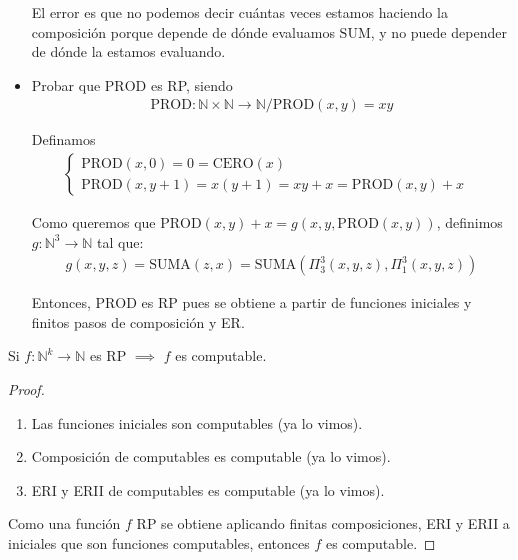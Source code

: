 \begin{itemize}
    El error es que no podemos decir cuántas veces estamos haciendo la 
    composición porque depende de dónde evaluamos $\mathrm{SUM}$, y no puede 
    depender de dónde la estamos evaluando.

    \item Probar que $\mathrm{PROD}$ es RP, siendo
    \begin{gather*}
        \mathrm{PROD}: \mathbb{N} \times \mathbb{N} \to \mathbb{N} /
        \mathrm{PROD}(x, y) = xy
    \end{gather*}

    Definamos
    \begin{gather*}
        \begin{cases}
            \mathrm{PROD}(x,0) = 0 = \mathrm{CERO}(x) & \\
            \mathrm{PROD}(x,y+1) = x(y+1) = xy+x = \mathrm{PROD}(x,y)+x &
        \end{cases}
    \end{gather*}

    Como queremos que 
    $\mathrm{PROD}(x,y)+x = g(x,y, \mathrm{PROD}(x,y))$,
    definimos $g: \mathbb{N}^3 \to \mathbb{N}$ tal que:
    \begin{gather*}
        g(x,y,z) = \mathrm{SUMA}(z,x) 
        = \mathrm{SUMA}(\Pi^3_3(x,y,z), \Pi^3_1(x,y,z))
    \end{gather*}

    Entonces, $\mathrm{PROD}$ es RP pues se obtiene a partir de funciones
    iniciales y finitos pasos de composición y ER.
\end{itemize}

\bigskip

\begin{teorema}{}{}
    Si $f: \mathbb{N}^k \to \mathbb{N}$ es RP $\implies$ $f$ es computable.
\end{teorema}

\begin{proof} \phantom{.}

    \begin{enumerate}
        \item Las funciones iniciales son computables (ya lo vimos).
        \item Composición de computables es computable (ya lo vimos).
        \item ERI y ERII de computables es computable (ya lo vimos).
    \end{enumerate}

    Como una función $f$ RP se obtiene aplicando finitas composiciones, ERI
    y ERII a iniciales que son funciones computables, entonces $f$ es 
    computable.

\end{proof}

